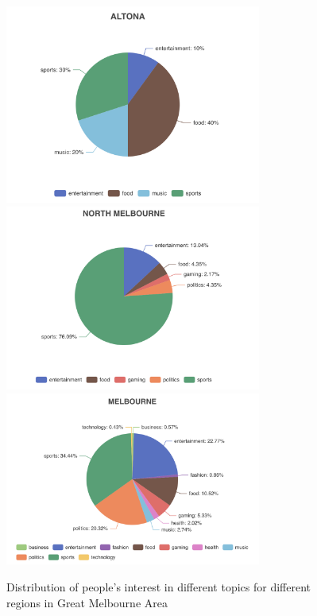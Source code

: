 \documentclass[parskip=full, 11pt]{article}
\begin{document}
\begin{figure}[H]
    \centering
    \includegraphics[width=0.75\textwidth]{Figures/Altona.png}
    \includegraphics[width=0.75\textwidth]{Figures/NorthMelbourne.png}
    \includegraphics[width=0.75\textwidth]{Figures/Melbourne.png}
    \caption{Distribution of people's interest in different topics for different regions in Great Melbourne Area}
    \label{fig:my_label}
\end{figure}
\end{document}
